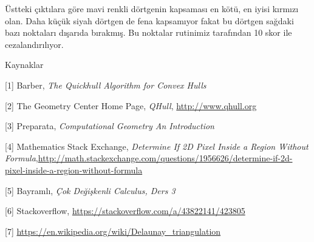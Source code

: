 \documentclass[12pt,fleqn]{article}\usepackage{../../common}
\begin{document}
Üstteki çıktılara göre mavi renkli dörtgenin kapsaması en kötü, en iyisi
kırmızı olan. Daha küçük siyah dörtgen de fena kapsamıyor fakat bu dörtgen
sağdaki bazı noktaları dışarıda bırakmış. Bu noktalar rutinimiz tarafından
10 skor ile cezalandırılıyor. 

Kaynaklar 

[1] Barber, {\em The Quickhull Algorithm for Convex Hulls}

[2] The Geometry Center Home Page, {\em QHull}, \url{http://www.qhull.org}

[3] Preparata, {\em Computational Geometry An Introduction}

[4] Mathematics Stack Exchange, {\em Determine If 2D Pixel Inside a Region Without Formula},\url{http://math.stackexchange.com/questions/1956626/determine-if-2d-pixel-inside-a-region-without-formula}

[5] Bayramlı, {\em Çok Değişkenli Calculus, Ders 3}

[6] Stackoverflow, \url{https://stackoverflow.com/a/43822141/423805}

[7] \url{https://en.wikipedia.org/wiki/Delaunay_triangulation}
\end{document}
